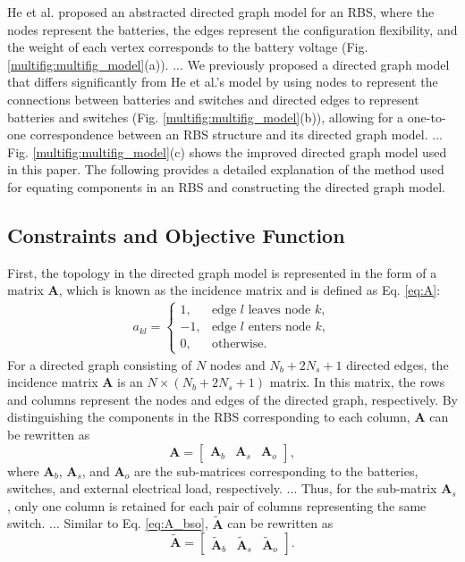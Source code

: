 \documentclass[a4paper]{article}
\begin{document}
He et al. \cite{heExploringAdaptiveReconfiguration2013} proposed an abstracted directed graph model for an RBS, where the nodes represent the batteries, the edges represent the configuration flexibility, and the weight of each vertex corresponds to the battery voltage (Fig. \ref{multifig:multifig_model}(a)). 
...
We previously proposed a directed graph model that differs significantly from He et al.'s model by using nodes to represent the connections between batteries and switches and directed edges to represent batteries and switches (Fig. \ref{multifig:multifig_model}(b)), allowing for a one-to-one correspondence between an RBS structure and its directed graph model. 
...
Fig. \ref{multifig:multifig_model}(c) shows the improved directed graph model used in this paper.
The following provides a detailed explanation of the method used for equating components in an RBS and constructing the directed graph model.


\subsection{Constraints and Objective Function}

First, the topology in the directed graph model is represented in the form of a matrix $\boldsymbol{A}$, which is known as the incidence matrix and is defined as Eq. \eqref{eq:A}:
\begin{align}\label{eq:A}
    a_{kl}=
    \begin{cases}
        1,  & \text{edge $l$ leaves node $k$},\\
        -1, & \text{edge $l$ enters node $k$},\\
        0,  & \text{otherwise}.
    \end{cases}
\end{align}
For a directed graph consisting of $N$ nodes and $N_b+2N_s+1$ directed edges, the incidence matrix $\boldsymbol{A}$ is an $N\times(N_b+2N_s+1)$ matrix. 
In this matrix, the rows and columns represent the nodes and edges of the directed graph, respectively.
By distinguishing the components in the RBS corresponding to each column, $\boldsymbol{A}$ can be rewritten as
\begin{equation}\label{eq:A_bso}
    \boldsymbol{A} =
    \begin{bmatrix}
        \boldsymbol{A}_b & \boldsymbol{A}_s & \boldsymbol{A}_o
    \end{bmatrix},
\end{equation}
where $\boldsymbol{A}_b$, $\boldsymbol{A}_s$, and $\boldsymbol{A}_o$ are the sub-matrices corresponding to the batteries, switches, and external electrical load, respectively.
...
Thus, for the sub-matrix $\boldsymbol{A}_s$, only one column is retained for each pair of columns representing the same switch.
...
Similar to Eq. \eqref{eq:A_bso}, $\boldsymbol{\tilde{A}}$ can be rewritten as
\begin{equation}\label{eq:A_bso_tilde}
    \boldsymbol{\tilde{A}} =
    \begin{bmatrix}
        \boldsymbol{\tilde{A}}_b & \boldsymbol{\tilde{A}}_s & \boldsymbol{\tilde{A}}_o
    \end{bmatrix}.
\end{equation}



\end{document}
